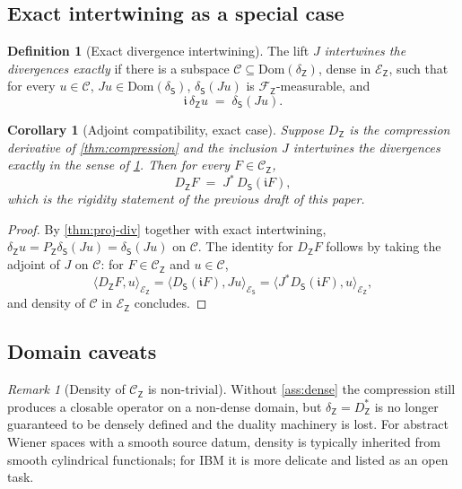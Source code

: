 \documentclass[11pt,reqno]{amsart}
\theoremstyle{plain}
\newtheorem{corollary}[theorem]{Corollary}
\theoremstyle{definition}
\newtheorem{definition}[theorem]{Definition}
\theoremstyle{remark}
\newtheorem{remark}[theorem]{Remark}
\newcommand{\Dom}{\mathrm{Dom}}
\newcommand{\Energy}{\mathcal{E}}
\newcommand{\Source}{\mathsf{S}}
\newcommand{\Obs}{\mathsf{Z}}
\renewcommand{\iota}{\mathfrak{i}}
\begin{document}
\subsection*{Exact intertwining as a special case}

\begin{definition}[Exact divergence intertwining]\label{def:dintertwine}
The lift $J$ \emph{intertwines the divergences exactly} if there is a
subspace $\mathcal C\subseteq\Dom(\delta_\Obs)$, dense in $\Energy_\Obs$,
such that for every $u\in\mathcal C$, $Ju\in\Dom(\delta_\Source)$,
$\delta_\Source(Ju)$ is $\mathcal F_\Obs$-measurable, and
\[
  \iota\,\delta_\Obs u \;=\; \delta_\Source(Ju).
\]
\end{definition}

\begin{corollary}[Adjoint compatibility, exact case]\label{cor:exact-intertwining}
Suppose $D_\Obs$ is the compression derivative of \cref{thm:compression}
and the inclusion $J$ intertwines the divergences exactly in the sense
of \cref{def:dintertwine}. Then for every $F\in\mathcal C_\Obs$,
\[
  D_\Obs F \;=\; J^{*}\,D_\Source(\iota F),
\]
which is the rigidity statement of the previous draft of this paper.
\end{corollary}

\begin{proof}
By \cref{thm:proj-div} together with exact intertwining,
$\delta_\Obs u = P_\Obs\delta_\Source(Ju) = \delta_\Source(Ju)$ on
$\mathcal C$. The identity for $D_\Obs F$ follows by taking the adjoint
of $J$ on $\mathcal C$: for $F\in\mathcal C_\Obs$ and $u\in\mathcal C$,
\[
  \langle D_\Obs F,u\rangle_{\Energy_\Obs}
  = \langle D_\Source(\iota F),Ju\rangle_{\Energy_\Source}
  = \langle J^{*}D_\Source(\iota F),u\rangle_{\Energy_\Obs},
\]
and density of $\mathcal C$ in $\Energy_\Obs$ concludes.
\end{proof}

\subsection*{Domain caveats}

\begin{remark}[Density of $\mathcal C_\Obs$ is non-trivial]
\label{rem:density-caveat}
Without \cref{ass:dense} the compression still produces a closable
operator on a non-dense domain, but $\delta_\Obs=D_\Obs^{*}$ is no longer
guaranteed to be densely defined and the duality machinery is lost. For
abstract Wiener spaces with a smooth source datum, density is typically
inherited from smooth cylindrical functionals; for IBM it is more
delicate and listed as an open task.
\end{remark}
\end{document}
